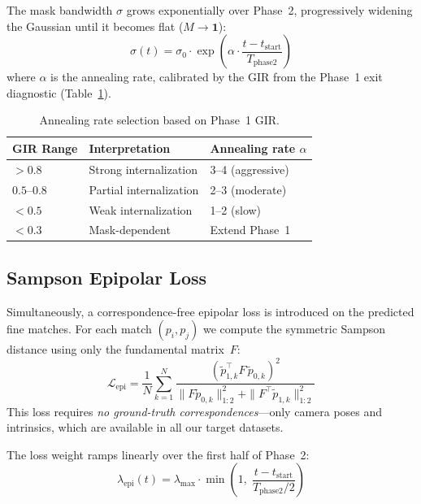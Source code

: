 \documentclass[11pt,a4paper]{article}
\begin{document}
The mask bandwidth $\sigma$ grows exponentially over Phase~2, progressively widening the Gaussian until it becomes flat ($M\to\mathbf{1}$):
\begin{equation}
    \sigma(t) = \sigma_0 \cdot \exp\!\left(\alpha \cdot \frac{t - t_{\text{start}}}{T_{\text{phase2}}}\right)
\end{equation}
where $\alpha$ is the annealing rate, calibrated by the GIR from the Phase~1 exit diagnostic (Table~\ref{tab:gir}).

\begin{table}[h]
\centering
\caption{Annealing rate selection based on Phase~1 GIR.}
\label{tab:gir}
\begin{tabular}{lll}
\toprule
\textbf{GIR Range} & \textbf{Interpretation} & \textbf{Annealing rate $\alpha$} \\
\midrule
$>0.8$ & Strong internalization & 3--4 (aggressive) \\
$0.5$--$0.8$ & Partial internalization & 2--3 (moderate) \\
$<0.5$ & Weak internalization & 1--2 (slow) \\
$<0.3$ & Mask-dependent & Extend Phase~1 \\
\bottomrule
\end{tabular}
\end{table}

\subsection{Sampson Epipolar Loss}

Simultaneously, a correspondence-free epipolar loss is introduced on the predicted fine matches.  For each match $(p_i, p_j)$ we compute the symmetric Sampson distance using only the fundamental matrix~$F$:
\begin{equation}
    \mathcal{L}_{\text{epi}} = \frac{1}{N}\sum_{k=1}^{N} \frac{(\tilde{p}_{1,k}^\top F\,\tilde{p}_{0,k})^2}
    {\|F\tilde{p}_{0,k}\|_{1:2}^2 + \|F^\top\tilde{p}_{1,k}\|_{1:2}^2}
\end{equation}
This loss requires \emph{no ground-truth correspondences}---only camera poses and intrinsics, which are available in all our target datasets.

The loss weight ramps linearly over the first half of Phase~2:
\begin{equation}
    \lambda_{\text{epi}}(t) = \lambda_{\max} \cdot \min\!\left(1,\;\frac{t - t_{\text{start}}}{T_{\text{phase2}}/2}\right)
\end{equation}
\end{document}
